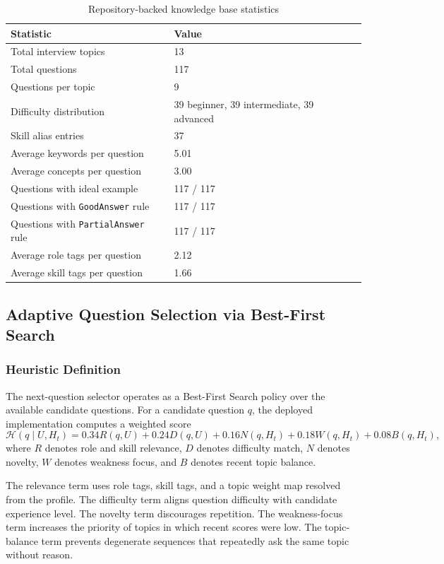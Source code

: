 \documentclass[conference]{IEEEtran}
\begin{document}
\begin{table}[t]
\centering
\caption{Repository-backed knowledge base statistics}
\label{tab:kb_stats}
\small
\begin{tabular}{L{3.0cm}L{3.0cm}}
\toprule
\textbf{Statistic} & \textbf{Value} \\
\midrule
Total interview topics & 13 \\
Total questions & 117 \\
Questions per topic & 9 \\
Difficulty distribution & 39 beginner, 39 intermediate, 39 advanced \\
Skill alias entries & 37 \\
Average keywords per question & 5.01 \\
Average concepts per question & 3.00 \\
Questions with ideal example & 117 / 117 \\
Questions with \texttt{GoodAnswer} rule & 117 / 117 \\
Questions with \texttt{PartialAnswer} rule & 117 / 117 \\
Average role tags per question & 2.12 \\
Average skill tags per question & 1.66 \\
\bottomrule
\end{tabular}
\end{table}

\subsection{Adaptive Question Selection via Best-First Search}
\subsubsection{Heuristic Definition}
The next-question selector operates as a Best-First Search policy over the available candidate questions. For a candidate question $q$, the deployed implementation computes a weighted score
\begin{equation}
\mathcal{H}(q \mid U, H_t) =
0.34R(q,U) + 0.24D(q,U) + 0.16N(q,H_t) + 0.18W(q,H_t) + 0.08B(q,H_t),
\label{eq:heuristic}
\end{equation}
where $R$ denotes role and skill relevance, $D$ denotes difficulty match, $N$ denotes novelty, $W$ denotes weakness focus, and $B$ denotes recent topic balance.

The relevance term uses role tags, skill tags, and a topic weight map resolved from the profile. The difficulty term aligns question difficulty with candidate experience level. The novelty term discourages repetition. The weakness-focus term increases the priority of topics in which recent scores were low. The topic-balance term prevents degenerate sequences that repeatedly ask the same topic without reason.
\end{document}
